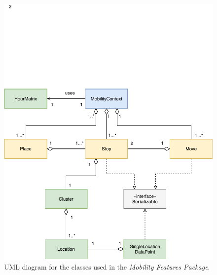 \begin{figure}[h]
    \centering
    \includegraphics[width=\textwidth]{./images/uml-mobility-features.pdf}
    \caption{UML diagram for the classes used in the \textit{Mobility Features Package}.}
    \label{fig:my_label}
\end{figure}


